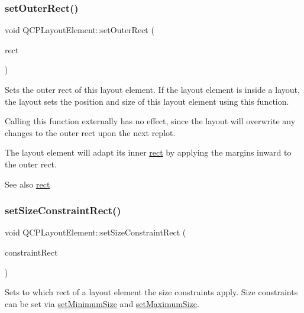 \subsubsection{\texorpdfstring{setOuterRect()}{setOuterRect()}}
{\footnotesize\ttfamily void Q\+C\+P\+Layout\+Element\+::set\+Outer\+Rect (\begin{DoxyParamCaption}\item[{const Q\+Rect \&}]{rect }\end{DoxyParamCaption})}

Sets the outer rect of this layout element. If the layout element is inside a layout, the layout sets the position and size of this layout element using this function.

Calling this function externally has no effect, since the layout will overwrite any changes to the outer rect upon the next replot.

The layout element will adapt its inner \mbox{\hyperlink{class_q_c_p_layout_element_a208effccfe2cca4a0eaf9393e60f2dd4}{rect}} by applying the margins inward to the outer rect.

\begin{DoxySeeAlso}{See also}
\mbox{\hyperlink{class_q_c_p_layout_element_a208effccfe2cca4a0eaf9393e60f2dd4}{rect}} 
\end{DoxySeeAlso}
\mbox{\label{class_q_c_p_layout_element_a361666cdcc6fbfd37344cc44be746b0f}} 
\subsubsection{\texorpdfstring{setSizeConstraintRect()}{setSizeConstraintRect()}}
{\footnotesize\ttfamily void Q\+C\+P\+Layout\+Element\+::set\+Size\+Constraint\+Rect (\begin{DoxyParamCaption}\item[{\mbox{\hyperlink{class_q_c_p_layout_element_a0afb3e5773529e4bd20e448f81be4d2a}{Size\+Constraint\+Rect}}}]{constraint\+Rect }\end{DoxyParamCaption})}

Sets to which rect of a layout element the size constraints apply. Size constraints can be set via \mbox{\hyperlink{class_q_c_p_layout_element_a5dd29a3c8bc88440c97c06b67be7886b}{set\+Minimum\+Size}} and \mbox{\hyperlink{class_q_c_p_layout_element_a74eb5280a737ab44833d506db65efd95}{set\+Maximum\+Size}}.

